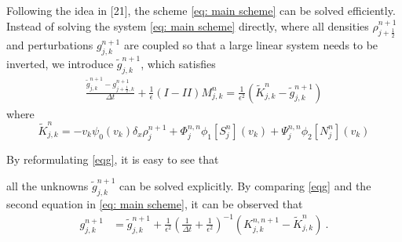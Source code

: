 \documentclass[11pt,twoside]{article}
\numberwithin{equation}{section}
\begin{document}
Following the idea in [21], the scheme \eqref{eq: main scheme} can be solved efficiently. Instead of solving the system \eqref{eq: main scheme} directly, where all densities $\rho_{j+\frac{1}{2}}^{n+1}$ and perturbations $g_{j,k}^{n+1}$ are coupled so that a large linear system needs to be inverted, we introduce $\tilde{g}_{j,k}^{n+1}$, which satisfies
\begin{eqnarray}\label{eqg}
    \frac{\tilde{g}_{j,k}^{n+1}-g_{j+\frac{1}{2},k}^{n+1}}{\Delta t}+\frac{1}{\epsilon}(I-II)M_{j,k}^n=\frac{1}{\epsilon^2}(\widetilde{K}_{j,k}^{n}-\tilde{g}_{j,k}^{n+1})
\end{eqnarray}
where
$$
\widetilde{K}_{j,k}^{n}=-v_k\psi_0(v_k)\delta_x\rho_{j}^{n+1}+{\Phi^{n,n}_{j}\phi_1[S_{j}^n](v_k)+\Psi^{n,n}_{j}\phi_2[N_{j}^n](v_k)}
$$

By reformulating \eqref{eqg}, it is easy to see that

 all the unknowns $\tilde{g}_{j,k}^{n+1}$ can be solved explicitly. By comparing \eqref{eqg} and the second equation in \eqref{eq: main scheme}, it can be observed that 
\begin{align}\label{g}
    g_{j,k}^{n+1}
    &=\tilde{g}_{j,k}^{n+1}+\frac{1}{\epsilon^2}\left(\frac{1}{\Delta t}+\frac{1}{\epsilon^2}\right)^{-1}\left( K_{j,k}^{n,n+1}-\widetilde{K}_{j,k}^n \right)\ .
\end{align}
\end{document}
